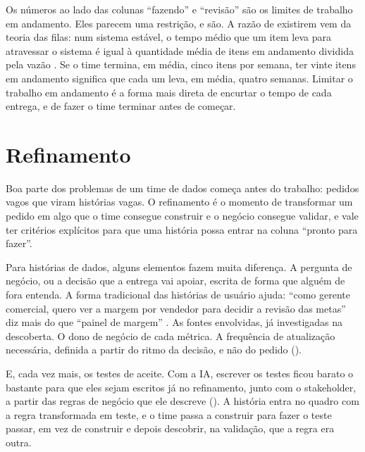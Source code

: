 Os números ao lado das colunas \enquote{fazendo} e \enquote{revisão} são os limites de
trabalho em andamento. Eles parecem uma restrição, e são. A razão de existirem vem da teoria
das filas: num sistema estável, o tempo médio que um item leva para atravessar o sistema é
igual à quantidade média de itens em andamento dividida pela vazão
\parencite{little1961,reinertsen2009}. Se o time termina, em média, cinco itens por semana, ter
vinte itens em andamento significa que cada um leva, em média, quatro semanas. Limitar o
trabalho em andamento é a forma mais direta de encurtar o tempo de cada entrega, e de fazer o
time terminar antes de começar.


\section{Refinamento}
\label{sec:refinamento}

Boa parte dos problemas de um time de dados começa antes do trabalho: pedidos vagos que viram
histórias vagas. O refinamento é o momento de transformar um pedido em algo que o time
consegue construir e o negócio consegue validar, e vale ter critérios explícitos para que uma
história possa entrar na coluna \enquote{pronto para fazer}.

Para histórias de dados, alguns elementos fazem muita diferença. A pergunta de negócio, ou a
decisão que a entrega vai apoiar, escrita de forma que alguém de fora entenda. A forma
tradicional das histórias de usuário ajuda: \enquote{como gerente comercial, quero ver a
margem por vendedor para decidir a revisão das metas} diz mais do que \enquote{painel de
margem} \parencite{cohn2004}. As fontes envolvidas, já investigadas na descoberta. O dono de
negócio de cada métrica. A frequência de atualização necessária, definida a partir do ritmo
da decisão, e não do pedido ().

E, cada vez mais, os testes de aceite. Com a IA, escrever os testes ficou barato o bastante
para que eles sejam escritos já no refinamento, junto com o stakeholder, a partir das regras
de negócio que ele descreve (). A história entra no quadro com a regra
transformada em teste, e o time passa a construir para fazer o teste passar, em vez de
construir e depois descobrir, na validação, que a regra era outra.

